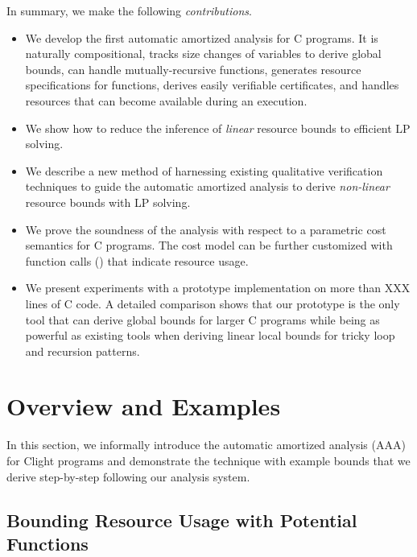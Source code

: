 \documentclass[nocopyrightspace,preprint,pldi]{sigplanconf-pldi15}
\newcommand{\ifshort}[2]{\ifx\fullversion\undefined{#1}\else{#2}\fi}
\newcommand{\sectskip}[0]{\ifshort{\vspace{-3pt}}{}}
\newcommand{\aftersectskip}[0]{\ifshort{\vspace{-1pt}}{}}
\begin{document}

In summary, we make the following \emph{contributions}.

\begin{itemize}
\item We develop the first automatic amortized analysis for C
  programs. It is naturally compositional, tracks size changes of
  variables to derive global bounds, can handle mutually-recursive
  functions, generates resource specifications for functions, derives
  easily verifiable certificates, and handles resources that can
  become available during an execution.
\item We show how to reduce the inference of \emph{linear} resource
    bounds to efficient LP solving.
\item We describe a new method of harnessing existing qualitative
  verification techniques to guide the automatic amortized analysis
  to derive \emph{non-linear} resource bounds with LP solving.
\item We prove the soundness of the analysis with respect to a
  parametric cost semantics for C programs. The cost model can be
  further customized with function calls () that
  indicate resource usage. %
\item We present experiments with a prototype implementation on more
  than XXX lines of C code. A detailed comparison shows that our
  prototype is the only tool that can derive global bounds for larger
  C programs while being as powerful as existing tools when deriving
  linear local bounds for tricky loop and recursion patterns.
\end{itemize}

\sectskip
\section{Overview and Examples}
\aftersectskip

In this section, we informally introduce the automatic amortized
analysis (AAA) for Clight programs and demonstrate the technique with
example bounds that we derive step-by-step following our analysis
system.


\subsection{Bounding Resource Usage with Potential Functions}
\end{document}
